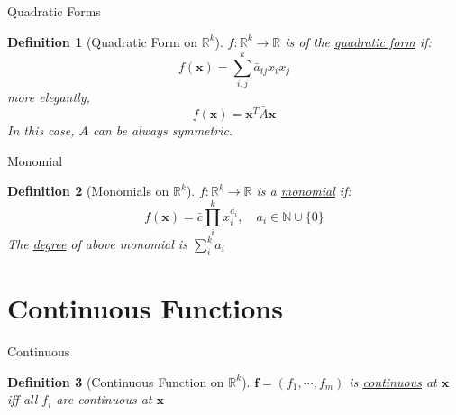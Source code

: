 \documentclass[final]{beamer}
\newtheorem{defn}{Definition}
\begin{document}
\begin{frame}[t]{Quadratic Forms}
	\begin{defn}
		[Quadratic Form on $\mathbb{R}^k$]
		$f:\mathbb{R}^k\rightarrow\mathbb{R}$ is of the \uline{quadratic form} if:
		\[
			f(\mathbf{x})=\sum_{i,j}^k \bar a_{ij} x_i x_j
		\]more elegantly, 
		\[
			f(\mathbf{x}) = \mathbf{x}^T \bar A \mathbf{x}
		\]
		In this case, $A$ can be always symmetric.
	\end{defn}
\end{frame}
\begin{frame}[t]{Monomial}
	\begin{defn}
		[Monomials on $\mathbb{R}^k$]
		$f:\mathbb{R}^k\rightarrow\mathbb{R}$ is a \uline{monomial} if:\[
			f(\mathbf{x})= \bar c \prod_{i}^k x_i^{\bar{a_i}}, \quad a_i\in\mathbb{N}\cup\{0\}
		\]
		The \uline{degree} of above monomial is $\sum_i^k a_i$
	\end{defn}
\end{frame}

\section{Continuous Functions} %
\label{sec:continuous_functions}
\begin{frame}[t]{Continuous}
	\begin{defn}
		[Continuous Function on $\mathbb{R}^k$]
		$\mathbf{f}=(f_1,\cdots,f_m)$ is \uline{continuous} at $\mathbf{x}$ iff all $f_i$ are continuous at $\mathbf{x}$
	\end{defn}
\end{frame}

%
\end{document}

